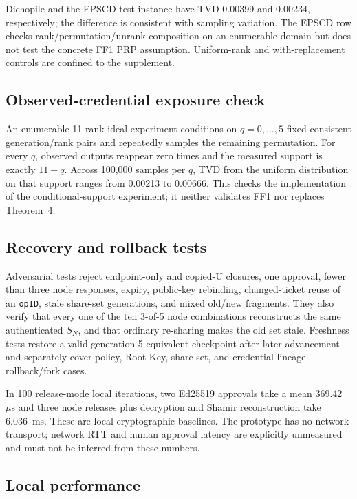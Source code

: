 \documentclass[preprint,12pt]{elsarticle}
\begin{document}
Dichopile and the EPSCD test instance have TVD 0.00399 and 0.00234,
respectively; the difference is consistent with sampling variation. The EPSCD
row checks rank/permutation/unrank composition on an enumerable domain but does
not test the concrete FF1 PRP assumption. Uniform-rank and with-replacement
controls are confined to the supplement.

\subsection{Observed-credential exposure check}

An enumerable 11-rank ideal experiment conditions on $q=0,\ldots,5$ fixed
consistent generation/rank pairs and repeatedly samples the remaining
permutation. For every $q$, observed outputs reappear zero times and the
measured support is exactly $11-q$. Across 100,000 samples per $q$, TVD from
the uniform distribution on that support ranges from 0.00213 to 0.00666. This
checks the implementation of the conditional-support experiment; it neither
validates FF1 nor replaces Theorem~4.

\subsection{Recovery and rollback tests}

Adversarial tests reject endpoint-only and copied-U closures, one approval,
fewer than three node responses, expiry, public-key rebinding, changed-ticket
reuse of an \texttt{opID}, stale share-set generations, and mixed old/new
fragments. They also verify that every one of the ten 3-of-5 node combinations
reconstructs the same authenticated $S_N$, and that ordinary re-sharing makes
the old set stale. Freshness tests restore a valid generation-5-equivalent
checkpoint after later advancement and separately cover policy, Root-Key,
share-set, and credential-lineage rollback/fork cases.

In 100 release-mode local iterations, two Ed25519 approvals take a mean
369.42~$\mu$s and three node releases plus decryption and Shamir reconstruction
take 6.036~ms. These are local cryptographic baselines. The prototype has no
network transport; network RTT and human approval latency are explicitly
unmeasured and must not be inferred from these numbers.

\subsection{Local performance}
\end{document}
